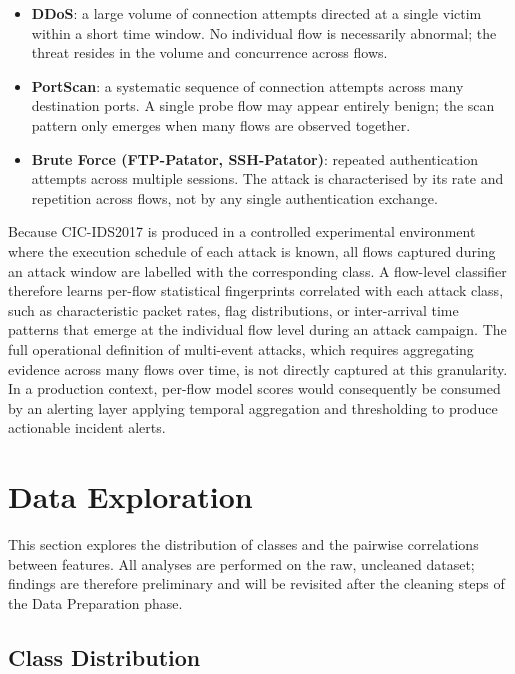 \documentclass[12pt,a4paper]{article}
\begin{document}
\begin{itemize}
    \item \textbf{DDoS}: a large volume of connection attempts directed at a single
          victim within a short time window. No individual flow is necessarily abnormal;
          the threat resides in the volume and concurrence across flows.
    \item \textbf{PortScan}: a systematic sequence of connection attempts across many
          destination ports. A single probe flow may appear entirely benign; the scan
          pattern only emerges when many flows are observed together.
    \item \textbf{Brute Force (FTP-Patator, SSH-Patator)}: repeated authentication
          attempts across multiple sessions. The attack is characterised by its rate
          and repetition across flows, not by any single authentication exchange.
\end{itemize}

Because CIC-IDS2017 is produced in a controlled experimental environment where the
execution schedule of each attack is known, all flows captured during an attack window
are labelled with the corresponding class. A flow-level classifier therefore learns
per-flow statistical fingerprints correlated with each attack class, such as
characteristic packet rates, flag distributions, or inter-arrival time patterns that
emerge at the individual flow level during an attack campaign. The full operational
definition of multi-event attacks, which requires aggregating evidence across many
flows over time, is not directly captured at this granularity. In a production context,
per-flow model scores would consequently be consumed by an alerting layer applying
temporal aggregation and thresholding to produce actionable incident alerts.

\section{Data Exploration}

This section explores the distribution of classes and the pairwise correlations between
features. All analyses are performed on the raw, uncleaned dataset; findings are
therefore preliminary and will be revisited after the cleaning steps of the Data
Preparation phase.

\subsection{Class Distribution}
\end{document}
